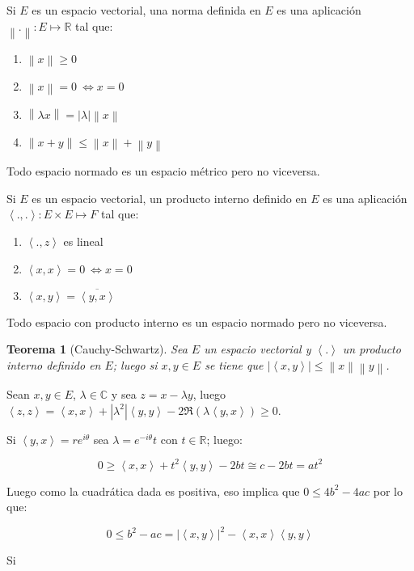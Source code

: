 \documentclass[11pt]{article}
\newcommand{\C}{\mathbb{C}}
\newcommand{\R}{{\mathbb{R}}}
\newcommand\norm[1]{\left\lVert#1\right\rVert}
\newcommand\abs[1]{\left\lvert#1\right\rvert}
\newcommand\ip[1]{\left\langle#1\right\rangle}
\newtheorem{theorem}{Teorema}[section]
\newenvironment{proof}[1][Demostraci\'on]{\begin{trivlist}
		\item[\hskip \labelsep {\bfseries #1}]}{\end{trivlist}}
\newenvironment{definition}[1][Definici\'on]{\begin{trivlist}
		\item[\hskip \labelsep {\bfseries #1}]}{\end{trivlist}}
\newenvironment{remark}[1][Observaci\'on]{\begin{trivlist}
		\item[\hskip \labelsep {\bfseries #1}]}{\end{trivlist}}
\newcommand{\qed}{\nobreak \ifvmode \relax \else
	\ifdim\lastskip<1.5em \hskip-\lastskip
	\hskip1.5em plus0em minus0.5em \fi \nobreak
	\vrule height0.75em width0.5em depth0.25em\fi}
\begin{document}
\begin{definition}
	Si $E$ es un espacio vectorial, una norma definida en $E$ es una aplicaci\'on $\norm{.}: E \mapsto \R$ tal que:
	
	\begin{enumerate}
		\item $\norm{x} \geq 0$
		\item $\norm{x} = 0 \ \Longleftrightarrow x = 0$
		\item $\norm{\lambda x} = \abs{\lambda} \norm{x} $
		\item $\norm{x+y} \leq \norm{x} + \norm{y}$
	\end{enumerate}
	
\end{definition}

\begin{remark}
	Todo espacio normado es un espacio m\'etrico pero no viceversa.
\end{remark}

\begin{definition}
	Si $E$ es un espacio vectorial, un producto interno definido en $E$ es una aplicaci\'on $\ip{.,.}: E \times E \mapsto F$ tal que:
	
	\begin{enumerate}
		\item $\ip{.,z}$ es lineal
		\item $\ip{x,x} = 0 \ \Longleftrightarrow x = 0$
		\item $\ip{x,y} = \overline{\ip{y,x}}$
	\end{enumerate}
	
\end{definition}


\begin{remark}
	Todo espacio con producto interno es un espacio normado pero no viceversa.
\end{remark}

\begin{theorem}[Cauchy-Schwartz]
	\label{Desigualdad de Cauchy-Schwartz }
	Sea $E$ un espacio vectorial y $\ip{.}$ un producto interno definido en $E$; luego si $x,y \in E$ se tiene que $\abs{\ip{x,y}} \leq \norm{x} \norm{y}$.
\end{theorem}

\begin{proof}
	Sean $x,y \in E$, $\lambda \in \C$ y sea $z = x-\lambda y$, luego $\ip{z,z} = \ip{x,x} + \abs{\lambda^2}\ip{y,y} -2 \Re(\lambda \ip{y,x}) \geq 0$.
	
	Si $\ip{y,x} = re^{i \theta}$ sea $\lambda = e^{-i \theta}t$ con $t \in \R$; luego:
	
	\[
		0 \geq \ip{x,x} + t^2 \ip{y,y} - 2bt \cong c -2bt = at^2
	\]
	
	Luego como la cuadr\'atica dada es positiva, eso implica que $0 \leq 4b^2 -4ac$ por lo que:
	
	\[
		0 \leq b^2 -ac = \abs{\ip{x,y}}^2 - \ip{x,x}\ip{y,y}
	\]
	
	Si 
	
	\qed
	
\end{proof}
\end{document}
